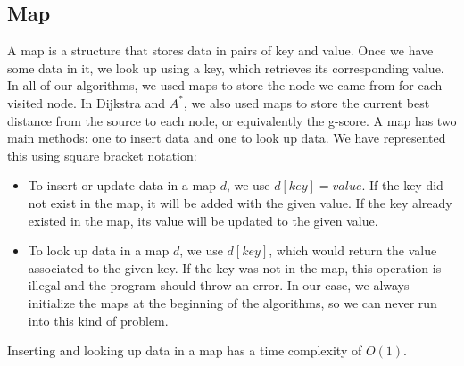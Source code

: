 \documentclass[12pt]{report}
\begin{document}
\begin{appendices}
\section{Map}
A map is a structure that stores data in pairs of key and value. Once we have some data in it, we look up using a key, which retrieves its corresponding value. In all of our algorithms, we used maps to store the node we came from for each visited node. In Dijkstra and $A^*$, we also used maps to store the current best distance from the source to each node, or equivalently the g-score. A map has two main methods: one to insert data and one to look up data. We have represented this using square bracket notation:
\begin{itemize}
\item To insert or update data in a map $d$, we use $d[key] = value$. If the key did not exist in the map, it will be added with the given value. If the key already existed in the map, its value will be updated to the given value.
\item To look up data in a map $d$, we use $d[key]$, which would return the value associated to the given key. If the key was not in the map, this operation is illegal and the program should throw an error. In our case, we always initialize the maps at the beginning of the algorithms, so we can never run into this kind of problem.
\end{itemize}
Inserting and looking up data in a map has a time complexity of $O(1)$.

\end{appendices}
\end{document}
